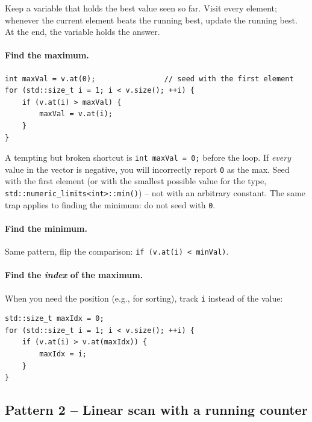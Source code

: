 \documentclass[11pt]{article}
\begin{document}
\begin{ideabox}
Keep a variable that holds the best value seen so far. Visit every
element; whenever the current element beats the running best, update
the running best. At the end, the variable holds the answer.
\end{ideabox}

\paragraph{Find the maximum.}
\begin{lstlisting}
int maxVal = v.at(0);                // seed with the first element
for (std::size_t i = 1; i < v.size(); ++i) {
    if (v.at(i) > maxVal) {
        maxVal = v.at(i);
    }
}
\end{lstlisting}

\begin{warnbox}
A tempting but broken shortcut is \texttt{int maxVal = 0;} before the
loop. If \emph{every} value in the vector is negative, you will
incorrectly report \texttt{0} as the max. Seed with the first element
(or with the smallest possible value for the type,
\texttt{std::numeric\_limits<int>::min()}) -- not with an arbitrary
constant. The same trap applies to finding the minimum: do not seed
with \texttt{0}.
\end{warnbox}

\paragraph{Find the minimum.} Same pattern, flip the comparison:
\texttt{if (v.at(i) < minVal)}.

\paragraph{Find the \emph{index} of the maximum.} When you need the
position (e.g., for sorting), track \texttt{i} instead of the value:
\begin{lstlisting}
std::size_t maxIdx = 0;
for (std::size_t i = 1; i < v.size(); ++i) {
    if (v.at(i) > v.at(maxIdx)) {
        maxIdx = i;
    }
}
\end{lstlisting}

\subsection{Pattern 2 -- Linear scan with a running counter}
\end{document}
